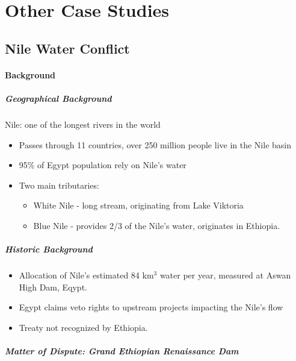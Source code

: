 \section{Other Case Studies}

\subsection{Nile Water Conflict}

\paragraph{Background}

\subparagraph{Geographical Background}

Nile: one of the longest rivers in the world

\begin{itemize}
    \item Passes through 11 countries, over 250 million people live in the Nile basin
    \item 95\% of Egypt population rely on Nile's water
    \item Two main tributaries:
        \begin{itemize}
            \item White Nile - long stream, originating from Lake Viktoria
            \item Blue Nile - provides 2/3 of the Nile's water, originates
                in Ethiopia.
        \end{itemize}
\end{itemize}

\subparagraph{Historic Background}

\begin{itemize}
    \item Allocation of Nile's estimated 84 km$^3$ water per year, measured
        at Aswan High Dam, Eqypt.
    \item Egypt claims veto rights to upstream projects impacting the Nile's flow
    \item Treaty not recognized by Ethiopia.
\end{itemize}

\subparagraph{Matter of Dispute: Grand Ethiopian Renaissance Dam}

